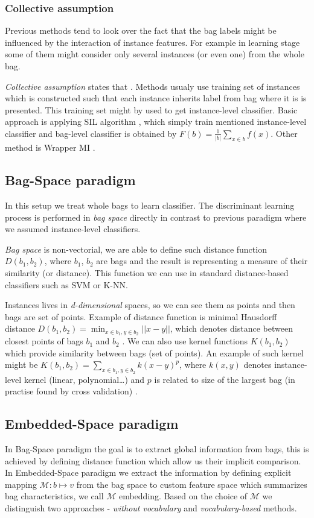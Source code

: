 \subsubsection{Collective assumption}
Previous methods tend to look over the fact that the bag labels might be influenced by the interaction of instance features. For example in learning stage some of them might consider only several instances (or even one) from the whole bag.

\emph{Collective assumption} states that  \cite{Xu2003}. Methods usualy use training set of instances which is constructed such that each instance inherits label from bag where it is is presented. This training set might by used to get instance-level classifier. Basic approach is applying SIL algorithm \cite{Bunescu2007}, which simply train mentioned instance-level classifier and bag-level classifier is obtained by $F(b)=\frac{1}{|b|}\sum_{x\in b}f(x)$. Other method is Wrapper MI \cite{Frank2003}.


\subsection{Bag-Space paradigm}
In this setup we treat whole bags to learn classifier. The discriminant learning process is performed in \emph{bag space} directly in contrast to previous paradigm where we assumed instance-level classifiers.

\emph{Bag space} is non-vectorial, we are able to define such distance function $D(b_1,b_2)$, where $b_1$, $b_2$ are bags and the result is representing a measure of their similarity (or distance). This function we can use in standard distance-based classifiers such as SVM or K-NN.

Instances lives in \emph{d-dimensional} spaces, so we can see them as points and then bags are set of points. Example of distance function is minimal Hausdorff distance $D(b_1,b_2)=\min_{x\in b_1, y\in b_2}||x-y||$, which denotes distance between closest points of bags $b_1$ and $b_2$ \cite{Wang2000}. We can also use kernel functions $K(b_1,b_2)$ which provide similarity between bags (set of points). An example of such kernel might be $K(b_1,b_2)=\sum_{x\in b_1, y\in b_2}k(x-y)^{p}$, where $k(x,y)$ denotes instance-level kernel (linear, polynomial\dots) and $p$ is related to size of the largest bag (in practise found by cross validation) \cite{Gartner2002}.

\subsection{Embedded-Space paradigm}
In Bag-Space paradigm the goal is to extract global information from bags, this is achieved by defining distance function which allow us their implicit comparison. In Embedded-Space paradigm we extract the information by defining explicit mapping $\mathcal{M}:b\mapsto v$ from the bag space to custom feature space which summarizes bag characteristics, we call $\mathcal{M}$ embedding. Based on the choice of $\mathcal{M}$ we distinguish two approaches - \emph{without vocabulary} and \emph{vocabulary-based} methods.


